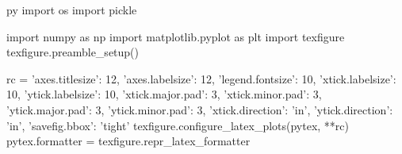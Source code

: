 \begin{pythontexcustomcode}{py}
import os
import pickle

import numpy as np
import matplotlib.pyplot as plt
import texfigure
texfigure.preamble_setup()

rc = {
      'axes.titlesize': 12,
      'axes.labelsize': 12,
      'legend.fontsize': 10,
      'xtick.labelsize': 10,
      'ytick.labelsize': 10,
      'xtick.major.pad': 3,
      'xtick.minor.pad': 3,
      'ytick.major.pad': 3,
      'ytick.minor.pad': 3,
      'xtick.direction': 'in',
      'ytick.direction': 'in',
      'savefig.bbox': 'tight'
      }
texfigure.configure_latex_plots(pytex, **rc)
pytex.formatter = texfigure.repr_latex_formatter
\end{pythontexcustomcode}
\begin{pycode}
\end{pycode}